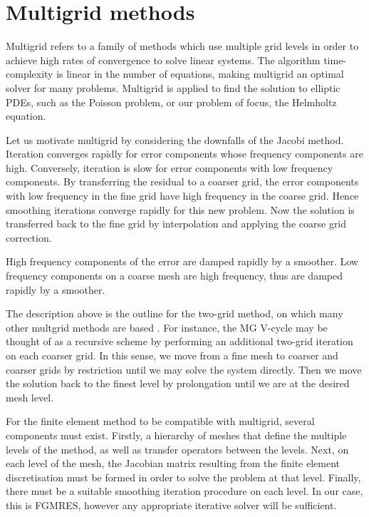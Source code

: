 \section{Multigrid methods}

Multigrid refers to a family of methods which use multiple grid levels in order to achieve high rates of convergence to solve linear systems.
The algorithm time-complexity is linear in the number of equations, making multigrid an optimal solver for many problems.
Multigrid is applied to find the solution to elliptic PDEs, such as the Poisson problem, or our problem of focus, the Helmholtz equation.

Let us motivate multigrid by considering the downfalls of the Jacobi method.
Iteration converges rapidly for error components whose frequency components are high.
Conversely, iteration is slow for error components with low frequency components.
By transferring the residual to a coarser grid, the error components with low frequency in the fine grid have high frequency in the coarse grid.
Hence smoothing iterations converge rapidly for this new problem.
Now the solution is transferred back to the fine grid by interpolation and applying the coarse grid correction.

High frequency components of the error are damped rapidly by a smoother.
Low frequency components on a coarse mesh are high frequency, thus are damped rapidly by a smoother.

The description above is the outline for the two-grid method, on which many other multgrid methods are based \cite{hackbusch}.
For instance, the MG V-cycle may be thought of as a recursive scheme by performing an additional two-grid iteration on each coarser grid.
In this sense, we move from a fine mesh to coarser and coarser grids by restriction until we may solve the system directly.
Then we move the solution back to the finest level by prolongation until we are at the desired mesh level. 

For the finite element method to be compatible with multigrid, several components must exist.
Firstly, a hierarchy of meshes that define the multiple levels of the method, as well as transfer operators between the levels.
Next, on each level of the mesh, the Jacobian matrix resulting from the finite element discretisation must be formed in order to solve the problem at that level.
Finally, there must be  a suitable smoothing iteration procedure on each level.
In our case, this is FGMRES, however any appropriate iterative solver will be sufficient.





